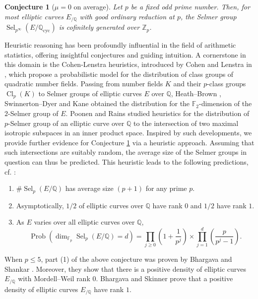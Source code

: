 \documentclass[12pt]{amsart}
\newtheorem{conjecture}[theorem]{Conjecture}
\newcommand{\Z}{\mathbb{Z}}
\newcommand{\Q}{\mathbb{Q}}
\newcommand{\F}{\mathbb{F}}
\newcommand{\op}[1]{\operatorname{#1}}
\numberwithin{equation}{section}
\begin{document}
\begin{conjecture}[$\mu=0$ on average]\label{mu=0 on average}
    Let $p$ be a fixed odd prime number. Then, for most elliptic curves $E_{/\Q}$ with good ordinary reduction at $p$, the Selmer group $\op{Sel}_{p^\infty}(E/\Q_{\op{cyc}})$ is cofinitely generated over $\Z_p$.
\end{conjecture}
\par Heuristic reasoning has been profoundly influential in the field of arithmetic statistics, offering insightful conjectures and guiding intuition. A cornerstone in this domain is the Cohen-Lenstra heuristics, introduced by Cohen and Lenstra in \cite{CLheuristics}, which propose a probabilistic model for the distribution of class groups of quadratic number fields. Passing from number fields $K$ and their $p$-class groups $\op{Cl}_p(K)$ to Selmer groups of elliptic curves $E$ over $\Q$, Heath--Brown \cite{HeathBrown1, HeathBrown2}, Swinnerton--Dyer \cite{Swinnerton-Dyer} and Kane \cite{Kane} obtained the distribution for the $\F_2$-dimension of the $2$-Selmer group of $E$. Poonen and Rains \cite{poonen} studied heuristics for the distribution of $p$-Selmer group of an elliptic curve over $\Q$ to the intersection of two maximal isotropic subspaces in an inner product space. Inspired by such developments, we provide further evidence for Conjecture \ref{mu=0 on average} via a heuristic approach. Assuming that such intersections are suitably random, the average size of the Selmer groups in question can thus be predicted. This heuristic leads to the following predictions, cf. \cite[Conjecture 1.1 and 1.2]{poonen}:
\begin{enumerate}
    \item $\# \op{Sel}_p(E/\Q)$ has average size $(p+1)$ for any prime $p$.
    \item Asymptotically, $1/2$ of elliptic curves over $\Q$ have rank $0$ and $1/2$ have rank $1$.
    \item As $E$ varies over all elliptic curves over $\Q$, 
    \[\op{Prob}\left(\dim_{\F_p} \op{Sel}_p(E/\Q)=d\right)=\prod_{j\geq 0} \left(1+\frac{1}{p^j}\right)\times \prod_{j=1}^d \left(\frac{p}{p^j-1}\right). \]
\end{enumerate}
When $p\leq 5$, part (1) of the above conjecture was proven by Bhargava and Shankar \cite{BSAnnals1, BSAnnals2, BS5Selmer}. Moreover, they show that there is a positive density of elliptic curves $E_{/\Q}$ with Mordell--Weil rank $0$. Bhargava and Skinner \cite{BhargavaSkinner} prove that a positive density of elliptic curves $E_{/\Q}$ have rank $1$.
\end{document}

